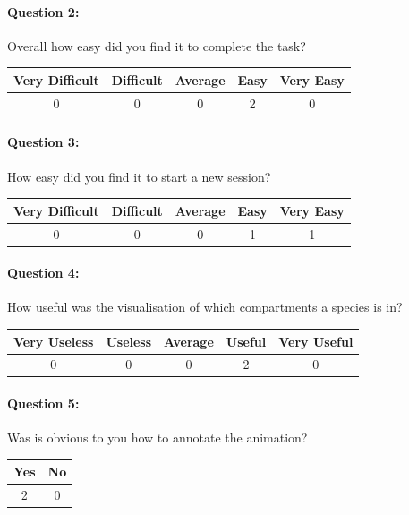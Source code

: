 \paragraph*{Question 2: } Overall how easy did you find it to complete the task?

\begin{center}
\begin{tabular}{ | c | c | c | c | c |}
    \hline
    Very Difficult & Difficult & Average & Easy & Very Easy \\
    \hline
    0 & 0 & 0 & 2 & 0 \\
    \hline
\end{tabular}
\end{center}

\paragraph*{Question 3: } How easy did you find it to start a new session?

\begin{center}
\begin{tabular}{ | c | c | c | c | c |}
    \hline
    Very Difficult & Difficult & Average & Easy & Very Easy \\
    \hline
    0 & 0 & 0 & 1 & 1 \\
    \hline
\end{tabular}
\end{center}

\paragraph*{Question 4: } How useful was the visualisation of which compartments a species is in?

\begin{center}
\begin{tabular}{ | c | c | c | c | c |}
    \hline
    Very Useless & Useless  & Average & Useful & Very Useful \\
    \hline
    0 & 0 & 0 & 2 & 0 \\
    \hline
\end{tabular}
\end{center}

\paragraph*{Question 5: } Was is obvious to you how to annotate the animation?

\begin{center}
\begin{tabular}{ | c | c |}
    \hline
    Yes & No\\
    \hline
    2 & 0 \\
    \hline
\end{tabular}
\end{center}



